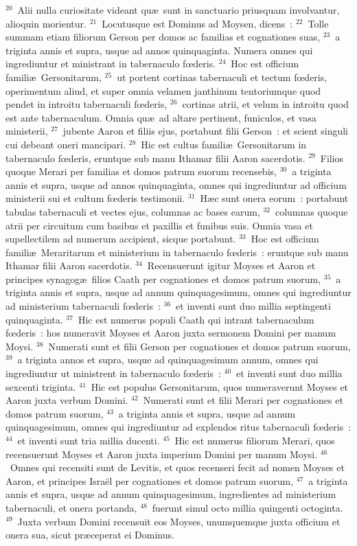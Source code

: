 ${}^{20}$~Alii nulla curiositate videant qu\ae\ sunt in sanctuario priusquam involvantur, alioquin morientur.
${}^{21}$~Locutusque est Dominus ad Moysen, dicens~:
${}^{22}$~Tolle summam etiam filiorum Gerson per domos ac familias et cognationes suas,
${}^{23}$~a triginta annis et supra, usque ad annos quinquaginta. Numera omnes qui ingrediuntur et ministrant in tabernaculo fœderis.
${}^{24}$~Hoc est officium famili\ae\ Gersonitarum,
${}^{25}$~ut portent cortinas tabernaculi et tectum fœderis, operimentum aliud, et super omnia velamen janthinum tentoriumque quod pendet in introitu tabernaculi fœderis,
${}^{26}$~cortinas atrii, et velum in introitu quod est ante tabernaculum. Omnia qu\ae\ ad altare pertinent, funiculos, et vasa ministerii,
${}^{27}$~jubente Aaron et filiis ejus, portabunt filii Gerson~: et scient singuli cui debeant oneri mancipari.
${}^{28}$~Hic est cultus famili\ae\ Gersonitarum in tabernaculo fœderis, eruntque sub manu Ithamar filii Aaron sacerdotis.
${}^{29}$~Filios quoque Merari per familias et domos patrum suorum recensebis,
${}^{30}$~a triginta annis et supra, usque ad annos quinquaginta, omnes qui ingrediuntur ad officium ministerii sui et cultum fœderis testimonii.
${}^{31}$~H\ae c sunt onera eorum~: portabunt tabulas tabernaculi et vectes ejus, columnas ac bases earum,
${}^{32}$~columnas quoque atrii per circuitum cum basibus et paxillis et funibus suis. Omnia vasa et supellectilem ad numerum accipient, sicque portabunt.
${}^{33}$~Hoc est officium famili\ae\ Meraritarum et ministerium in tabernaculo fœderis~: eruntque sub manu Ithamar filii Aaron sacerdotis.
${}^{34}$~Recensuerunt igitur Moyses et Aaron et principes synagog\ae\ filios Caath per cognationes et domos patrum suorum,
${}^{35}$~a triginta annis et supra, usque ad annum quinquagesimum, omnes qui ingrediuntur ad ministerium tabernaculi fœderis~:
${}^{36}$~et inventi sunt duo millia septingenti quinquaginta.
${}^{37}$~Hic est numerus populi Caath qui intrant tabernaculum fœderis~: hos numeravit Moyses et Aaron juxta sermonem Domini per manum Moysi.
${}^{38}$~Numerati sunt et filii Gerson per cognationes et domos patrum suorum,
${}^{39}$~a triginta annos et supra, usque ad quinquagesimum annum, omnes qui ingrediuntur ut ministrent in tabernaculo fœderis~:
${}^{40}$~et inventi sunt duo millia sexcenti triginta.
${}^{41}$~Hic est populus Gersonitarum, quos numeraverunt Moyses et Aaron juxta verbum Domini.
${}^{42}$~Numerati sunt et filii Merari per cognationes et domos patrum suorum,
${}^{43}$~a triginta annis et supra, usque ad annum quinquagesimum, omnes qui ingrediuntur ad explendos ritus tabernaculi fœderis~:
${}^{44}$~et inventi sunt tria millia ducenti.
${}^{45}$~Hic est numerus filiorum Merari, quos recensuerunt Moyses et Aaron juxta imperium Domini per manum Moysi.
${}^{46}$~Omnes qui recensiti sunt de Levitis, et quos recenseri fecit ad nomen Moyses et Aaron, et principes Isra\"el per cognationes et domos patrum suorum,
${}^{47}$~a triginta annis et supra, usque ad annum quinquagesimum, ingredientes ad ministerium tabernaculi, et onera portanda,
${}^{48}$~fuerunt simul octo millia quingenti octoginta.
${}^{49}$~Juxta verbum Domini recensuit eos Moyses, unumquemque juxta officium et onera sua, sicut pr\ae ceperat ei Dominus.


